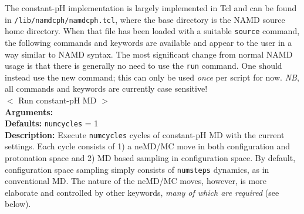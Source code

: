 The constant-pH implementation is largely implemented in Tcl and can be found
  in \texttt{/lib/namdcph/namdcph.tcl}, where the base directory is the NAMD
  source home directory.
When that file has been loaded with a suitable \texttt{source} command, the 
  following commands and keywords are available and appear to the user in a way
  similar to NAMD syntax.
The most significant change from normal NAMD usage is that there is generally
  no need to use the \texttt{run} command.
One should instead use the new  command;
this can only be used \emph{once} per script for now.
\textit{NB}, all commands and keywords are currently case sensitive!
\\[11pt]
\noindent
{} $<$ Run constant-pH MD $>$
\\
\textbf{Arguments:} { }
\\
\textbf{Defaults:} {{\tt numcycles} = 1}
\\
\textbf{Description:}
Execute {\tt numcycles} cycles of constant-pH MD with the current settings.
Each cycle consists of 1) a neMD/MC move in both configuration and protonation
  space and 2) MD based sampling in configuration space.
By default, configuration space sampling simply consists of {\tt numsteps}
  dynamics, as in conventional MD.
The nature of the neMD/MC moves, however, is more elaborate and controlled by
  other keywords, \emph{many of which are required} (see below).

